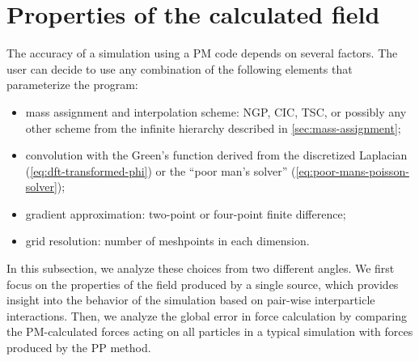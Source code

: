 \section{Properties of the calculated field}
The accuracy of a simulation using a PM code depends on several factors.
The user can decide to use any combination of the following elements that parameterize the program:
\begin{itemize}
    \item mass assignment and interpolation scheme: NGP, CIC, TSC, or possibly any other scheme from the infinite hierarchy described in \autoref{sec:mass-assignment};
    \item convolution with the Green's function derived from the discretized Laplacian (\autoref{eq:dft-transformed-phi}) or the ``poor man's solver'' (\autoref{eq:poor-mans-poisson-solver});
    \item gradient approximation: two-point or four-point finite difference;
    \item grid resolution: number of meshpoints in each dimension.
\end{itemize}
In this subsection, we analyze these choices from two different angles.
We first focus on the properties of the field produced by a single source, which provides insight into the behavior of the simulation based on pair-wise interparticle interactions.
Then, we analyze the global error in force calculation by comparing the PM-calculated forces acting on all particles in a typical simulation with forces produced by the PP method.

